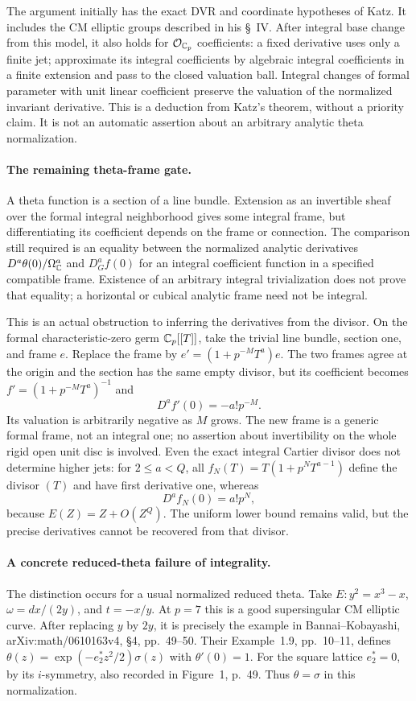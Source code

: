 \documentclass[11pt]{article}
\theoremstyle{definition}\newtheorem{definition}[theorem]{Definition}\newtheorem{remark}[theorem]{Remark}
\begin{document}
The argument initially has the exact DVR and coordinate hypotheses
of Katz. It includes the CM elliptic groups described in his \S~IV.
After integral base change from this model, it also holds for
$\mathcal O_{\mathbb C_p}$ coefficients: a fixed derivative uses only a
finite jet; approximate its integral coefficients by algebraic
integral coefficients in a finite extension and pass to the closed
valuation ball. Integral changes of formal parameter with unit
linear coefficient preserve the valuation of the normalized
invariant derivative. This is a deduction from Katz's theorem,
without a priority claim. It is not an automatic assertion about
an arbitrary analytic theta normalization.

\paragraph{The remaining theta-frame gate.}
A theta function is a section of a line bundle. Extension as an
invertible sheaf over the formal integral neighborhood gives some
integral frame, but differentiating its coefficient depends on the
frame or connection. The comparison still required is an equality
between the normalized analytic derivatives
$D^a\theta(0)/\Omega_{\mathbb C}^a$ and $D_G^af(0)$ for an integral
coefficient function in a specified compatible frame. Existence of
an arbitrary integral trivialization does not prove that equality;
a horizontal or cubical analytic frame need not be integral.

This is an actual obstruction to inferring the derivatives from
the divisor. On the formal characteristic-zero germ
$\mathbb C_p[[T]]$, take the trivial line bundle, section one, and frame
$e$. Replace the frame by
$e'=(1+p^{-M}T^a)e$. The two frames agree at the origin and the
section has the same empty divisor, but its coefficient becomes
$f'=(1+p^{-M}T^a)^{-1}$ and
\[
 D^af'(0)=-a!p^{-M}.
\]
Its valuation is arbitrarily negative as $M$ grows. The new frame
is a generic formal frame, not an integral one; no assertion about
invertibility on the whole rigid open unit disc is involved.
Even the exact integral Cartier divisor does not determine higher
jets: for $2\leq a<Q$, all
$f_N(T)=T(1+p^NT^{a-1})$ define the divisor $(T)$ and have first
derivative one, whereas
\[
 D^af_N(0)=a!p^N,
\]
because $E(Z)=Z+O(Z^Q)$. The uniform lower bound remains valid,
but the precise derivatives cannot be recovered from that divisor.

\paragraph{A concrete reduced-theta failure of integrality.}
The distinction occurs for a usual normalized reduced theta.
Take $E:y^2=x^3-x$, $\omega=dx/(2y)$, and $t=-x/y$.
At $p=7$ this is a good supersingular CM elliptic curve.
After replacing $y$ by $2y$, it is precisely the example in
Bannai--Kobayashi, arXiv:math/0610163v4, \S4, pp.~49--50.
Their Example~1.9, pp.~10--11, defines
$\theta(z)=\exp(-e_2^*z^2/2)\sigma(z)$ with $\theta'(0)=1$.
For the square lattice $e_2^*=0$, by its $i$-symmetry, also recorded
in Figure~1, p.~49. Thus $\theta=\sigma$ in this normalization.
\end{document}
